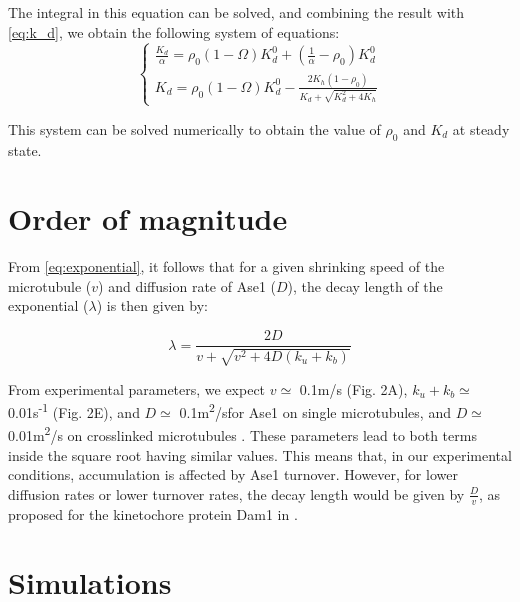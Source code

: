 \documentclass{article}
\newcommand{\ums}{\textmu m/s}
\newcommand{\umsqs}{\textmu m\textsuperscript{2}/s}
\begin{document}
The integral in this equation can be solved, and combining the result with \autoref{eq:k_d}, we obtain the following system of equations:
\begin{equation}
\begin{cases}
\frac{K_d}{\alpha} = \rho_0(1-\Omega)K_d^0 + (\frac{1}{\alpha}-\rho_0)K_d^0\\
K_d = \rho_0(1-\Omega)K_d^0 - \frac{2K_h(1-\rho_0)}{K_d+\sqrt{K_d^2+4K_h}}
\end{cases}
\end{equation}

This system can be solved numerically to obtain the value of $\rho_0$ and $K_d$ at steady state.

\section{Order of magnitude}

From \autoref{eq:exponential}, it follows that for a given shrinking speed of the microtubule ($v$) and diffusion rate of Ase1 ($D$), the decay length of the exponential ($\lambda$) is then given by:


\begin{equation}
\label{eq:decay_length}
\lambda = \frac{2D}{v+\sqrt{v^2 + 4D(k_u+k_b)}}
\end{equation}

From experimental parameters, we expect  $v\simeq$ 0.1\ums{} (Fig. 2A), $k_u+k_b\simeq$ 0.01s\textsuperscript{-1} (Fig. 2E), and $D\simeq$ 0.1\umsqs for Ase1 on single microtubules, and $D\simeq$ 0.01\umsqs{} on crosslinked microtubules \cite{Lansky2015}. These parameters lead to both terms inside the square root having similar values. This means that, in our experimental conditions, accumulation is affected by Ase1 turnover. However, for lower diffusion rates or lower turnover rates, the decay length would be given by $\frac{D}{v}$, as proposed for the kinetochore protein Dam1 in \cite{Gardner2008b}.

\section{Simulations}
\end{document}

